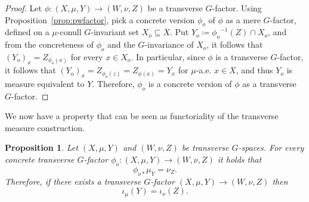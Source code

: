 \documentclass{amsart}
\numberwithin{equation}{subsection}
\newtheorem{prop}[thm]{Proposition}
\theoremstyle{remark}
\begin{document}
\begin{proof}
Let \(\phi:\left(X,\mu,Y\right)\to\left(W,\nu,Z\right)\) be a transverse \(G\)-factor. Using Proposition~\ref{prop:pwfactor}, pick a concrete version \(\phi_{o}\) of \(\phi\) as a mere \(G\)-factor, defined on a \(\mu\)-conull \(G\)-invariant set \(X_{o}\subseteq X\). Put \(Y_{o}\coloneqq{\phi_{o}}^{-1}\left(Z\right)\cap X_{o}\), and from the concreteness of \(\phi_{o}\) and the \(G\)-invariance of \(X_{o}\), it follows that \(\left(Y_{o}\right)_{x}=Z_{\phi_{o}\left(x\right)}\) for every \(x\in X_{o}\). In particular, since \(\phi\) is a transverse \(G\)-factor, it follows that \(\left(Y_{o}\right)_{x}=Z_{\phi_{o}\left(z\right)}=Z_{\phi\left(x\right)}=Y_{x}\) for \(\mu\)-a.e. \(x\in X\), and thus \(Y_{o}\) is measure equivalent to \(Y\). Therefore, \(\phi_{o}\) is a concrete version of \(\phi\) as a transverse \(G\)-factor.
\end{proof}

We now have a property that can be seen as functoriality of the transverse measure construction.

\begin{prop}\label{prop:factor}
Let \(\left(X,\mu,Y\right)\) and \(\left(W,\nu,Z\right)\) be transverse \(G\)-spaces. For every concrete transverse \(G\)-factor \(\phi_{o}:\left(X,\mu,Y\right)\to \left(W,\nu,Z\right)\) it holds that
\[\phi_{o\ast}\mu_{Y}=\nu_{Z}.\]
Therefore, if there exists a transverse \(G\)-factor \(\left(X,\mu,Y\right)\to \left(W,\nu,Z\right)\) then
\[\iota_{\mu}\left(Y\right)=\iota_{\nu}\left(Z\right).\] 
\end{prop}
\end{document}
